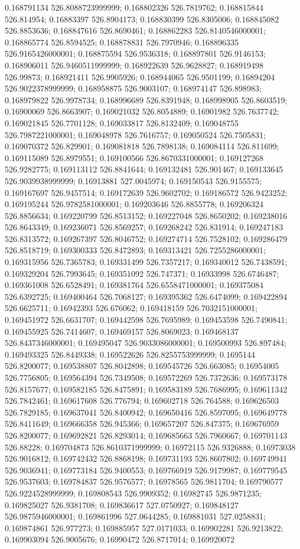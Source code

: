 0.168791134 526.8088723999999; 0.168802326 526.7819762; 0.168815844 526.814954; 0.16883397 526.8904173; 0.168830399 526.8305006; 0.168845082 526.8853636; 0.168847616 526.8690461; 0.168862283 526.8140546000001; 0.168865774 526.8594525; 0.168878831 526.7970946; 0.168896335 526.9165426000001; 0.168875594 526.9536318; 0.168897801 526.9146153; 0.168906011 526.9460511999999; 0.168922639 526.9628827; 0.168919498 526.99873; 0.168921411 526.9905926; 0.168944065 526.9501199; 0.16894204 526.9022378999999; 0.168958875 526.9003107; 0.168974147 526.898983; 0.168979822 526.9978734; 0.168996689 526.8391948; 0.168998905 526.8603519; 0.16900069 526.8663907; 0.169021032 526.8054889; 0.16901982 526.7637742; 0.169021845 526.7701128; 0.169033817 526.8132409; 0.169048755 526.7987221000001; 0.169048978 526.7616757; 0.169050524 526.7505831; 0.169070372 526.829901; 0.169081818 526.7898138; 0.169084114 526.811699; 0.169115089 526.8979551; 0.169100566 526.8670331000001; 0.169127268 526.9282775; 0.169113112 526.8841644; 0.169132481 526.901467; 0.169133645 526.9039938999999; 0.16913881 527.0045974; 0.169150543 526.9155575; 0.169167697 526.9457514; 0.169172639 526.9602702; 0.169186572 526.9423252; 0.169195244 526.9782581000001; 0.169203646 526.8855778; 0.169206324 526.8856634; 0.169220799 526.8513152; 0.169227048 526.8650202; 0.169238016 526.8643349; 0.169236071 526.8569257; 0.169268242 526.831914; 0.169247183 526.8313572; 0.169267397 526.8046752; 0.169274714 526.7528102; 0.169286479 526.8518719; 0.169300333 526.8472893; 0.169313421 526.7255286000001; 0.169315956 526.7365783; 0.169331499 526.7357217; 0.169340012 526.7438591; 0.169329204 526.7993645; 0.169351092 526.747371; 0.16933998 526.6746487; 0.169361008 526.6528491; 0.169381764 526.6558471000001; 0.169375084 526.6392725; 0.169400464 526.7068127; 0.169395362 526.6474099; 0.169422894 526.6625711; 0.16942393 526.676062; 0.169418159 526.7032151000001; 0.169451972 526.6631707; 0.169442598 526.7695989; 0.169453598 526.7490841; 0.169455925 526.7414607; 0.169469157 526.8069023; 0.169468137 526.8437346000001; 0.169495047 526.9033086000001; 0.169500993 526.897484; 0.169493325 526.8449338; 0.169522626 526.8255753999999; 0.1695144 526.8200077; 0.169538807 526.8042898; 0.169545726 526.663085; 0.16954005 526.7756805; 0.169564394 526.7349508; 0.169572269 526.7372636; 0.169573178 526.8157677; 0.169582185 526.8475891; 0.169583189 526.7686995; 0.169611342 526.7842461; 0.169617608 526.776794; 0.169602718 526.764588; 0.169626503 526.7829185; 0.169637041 526.8400942; 0.169650416 526.8597095; 0.169649778 526.8411649; 0.169666358 526.945366; 0.169657207 526.847375; 0.169676959 526.8200077; 0.169692821 526.8293014; 0.169685663 526.7960667; 0.169701143 526.88228; 0.169704873 526.8610371999999; 0.16972115 526.9326888; 0.16973038 526.9016812; 0.169742432 526.8868198; 0.169731193 526.8607802; 0.169749941 526.9036941; 0.169773184 526.9400553; 0.169766919 526.9179987; 0.169779545 526.9537603; 0.169784837 526.9576577; 0.16978565 526.9811704; 0.169790577 526.9224528999999; 0.169808543 526.9909352; 0.16982745 526.9871235; 0.169825027 526.9381708; 0.169836617 527.0750927; 0.169848127 526.9875946000001; 0.169861996 527.0644285; 0.169881031 527.0258831; 0.169874861 526.977273; 0.169885957 527.0171033; 0.169902281 526.9213822; 0.169903094 526.9005676; 0.16990472 526.8717014; 0.169920072 